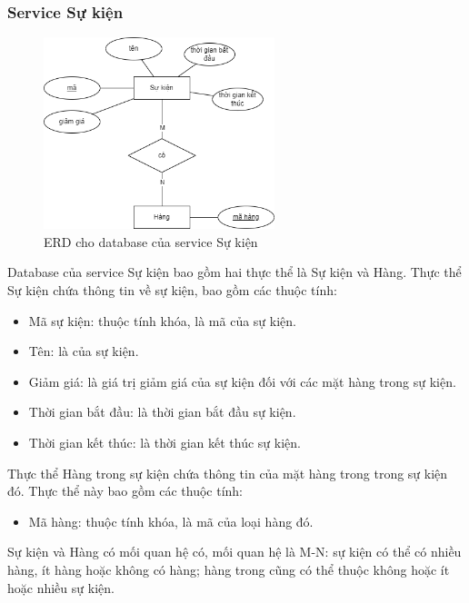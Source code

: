 \subsubsection{Service Sự kiện}
\begin{figure}[!htp]
    \begin{center}
        \includegraphics[width=0.6\textwidth]{img/database/erd/eerd-event.png}
        \newline
        \caption{ERD cho database của service Sự kiện}
    \end{center}
\end{figure}

\par Database của service Sự kiện bao gồm hai thực thể là Sự kiện và Hàng. Thực thể Sự kiện chứa thông tin về sự kiện, bao gồm các thuộc tính:
\begin{itemize}
    \item Mã sự kiện: thuộc tính khóa, là mã của sự kiện.
    \item Tên: là của sự kiện.
    \item Giảm giá: là giá trị giảm giá của sự kiện đối với các mặt hàng trong sự kiện.
    \item Thời gian bắt đầu: là thời gian bắt đầu sự kiện.
    \item Thời gian kết thúc: là thời gian kết thúc sự kiện.
\end{itemize}

\par Thực thể Hàng trong sự kiện chứa thông tin của mặt hàng trong trong sự kiện đó. Thực thể này bao gồm các thuộc tính:
\begin{itemize}
    \item Mã hàng: thuộc tính khóa, là mã của loại hàng đó.
\end{itemize}

\par Sự kiện và Hàng có mối quan hệ có, mối quan hệ là M-N: sự kiện có thể có nhiều hàng, ít hàng hoặc không có hàng; hàng trong cũng có thể thuộc không hoặc ít hoặc nhiều sự kiện.

